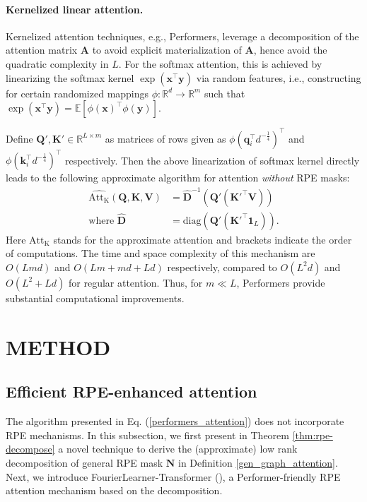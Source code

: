 \paragraph{Kernelized linear attention.} Kernelized attention techniques, e.g., Performers, leverage a decomposition of the attention matrix $\mathbf{A}$ to avoid explicit materialization of $\mathbf{A}$, hence avoid the quadratic complexity in $L$. For the softmax attention, this is achieved by linearizing the softmax kernel $\exp(\mathbf{x}^{\top}\mathbf{y})$ via random features, i.e., constructing for certain randomized mappings $\phi: \mathbb{R}^{d} \rightarrow \mathbb{R}^{m}$ such that $\exp(\mathbf{x}^{\top}\mathbf{y}) = \mathbb{E}[\phi(\mathbf{x})^{\top}\phi(\mathbf{y})]$.

Define $\mathbf{Q}',\mathbf{K}' \in \mathbb{R}^{L \times m}$ as matrices of rows given as $\phi(\mathbf{q}_{i}^{\top}d^{-\frac{1}{4}})^{\top}$ and $\phi(\mathbf{k}_{i}^{\top}d^{-\frac{1}{4}})^{\top}$ respectively. Then the above linearization of softmax kernel directly leads to the following approximate algorithm for attention \textit{without} RPE masks:
\begin{align}
    \widehat{\mathrm{Att}_\mathrm{K}} (\mathbf{Q}, \mathbf{K}, \mathbf{V})&  = \widehat{\mathbf{D}}^{-1} (\mathbf{Q}'(\mathbf{K}'^{\top} \mathbf{V})) \nonumber \\
    \text{where }\widehat{\mathbf{D}} &= \mathrm{diag} (\mathbf{Q}'(\mathbf{K}'^{\top} \mathbf{1}_L) ). \label{performers_attention}
\end{align}    
Here $\widehat{\mathrm{Att}_{\mathrm{K}}}$ stands for the approximate attention and brackets indicate the order of computations. The time and space complexity of this mechanism are $O(Lmd)$ and $O(Lm+md+Ld)$ respectively, compared to $O(L^{2}d)$ and $O(L^{2}+Ld)$ for regular attention. Thus, for $m \ll L $, Performers provide substantial computational improvements.

\section{METHOD}
\label{sec:algorithms}
\subsection{Efficient RPE-enhanced attention}
\label{subsec:flt}
The algorithm presented in Eq. (\ref{performers_attention}) does not incorporate RPE mechanisms. In this subsection, we first present in Theorem \ref{thm:rpe-decompose} a novel technique to derive the (approximate) low rank decomposition of general RPE mask $\mathbf{N}$ in Definition \ref{gen_graph_attention}. Next, we introduce \textrm{FourierLearner-Transformer} (\FLT), a Performer-friendly RPE attention mechanism based on the decomposition. 

